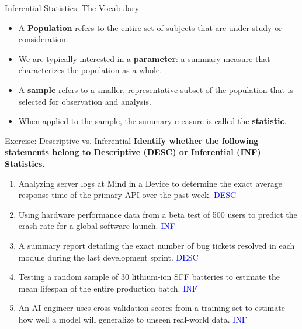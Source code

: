 \documentclass[aspectratio=169]{beamer}
\begin{document}
\begin{frame}{Inferential Statistics: The Vocabulary}
    \begin{itemize}
        \item A \textbf{Population} refers to the entire set of subjects that are under study or consideration.
        \vspace{0.2cm}
        \item We are typically interested in a \textbf{parameter}: a summary measure that characterizes the population as a whole.
        \vspace{0.6cm}
        \item A \textbf{sample} refers to a smaller, representative subset of the population that is selected for observation and analysis.
        \vspace{0.2cm}
        \item When applied to the sample, the summary measure is called the \textbf{statistic}.
    \end{itemize}
\end{frame}

\begin{frame}{Exercise: Descriptive vs. Inferential}
    \small
    \textbf{Identify whether the following statements belong to Descriptive (DESC) or Inferential (INF) Statistics.}

    \vspace{0.3cm}
    \begin{enumerate}
        \item Analyzing server logs at Mind in a Device to determine the exact average response time of the primary API over the past week. \pause \hfill \textcolor{blue}{DESC} \pause
        
        \vspace{0.2cm}
        \item Using hardware performance data from a beta test of 500 users to predict the crash rate for a global software launch. \pause \hfill \textcolor{blue}{INF} \pause
        
        \vspace{0.2cm}
        \item A summary report detailing the exact number of bug tickets resolved in each module during the last development sprint. \pause \hfill \textcolor{blue}{DESC} \pause
        
        \vspace{0.2cm}
        \item Testing a random sample of 30 lithium-ion SFF batteries to estimate the mean lifespan of the entire production batch. \pause \hfill \textcolor{blue}{INF} \pause
        
        \vspace{0.2cm}
        \item An AI engineer uses cross-validation scores from a training set to estimate how well a model will generalize to unseen real-world data. \pause \hfill \textcolor{blue}{INF}
    \end{enumerate}
\end{frame}
\end{document}
